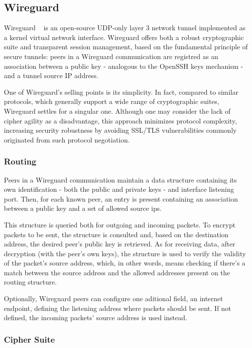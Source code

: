 \documentclass[11pt,twoside,a4paper]{report}
\begin{document}
\subsection{Wireguard}

Wireguard ~\cite{donenfeld2017wireguard} is an open-source UDP-only layer 3 network tunnel implemented as a kernel virtual network interface. Wireguard offers both a robust cryptographic suite and transparent session management, based on the fundamental principle of secure tunnels: peers in a Wireguard communication are registred as an association between a public key - analogous to the OpenSSH keys mechanism - and a tunnel source IP address.

One of Wireguard's selling points is its simplicity. In fact, compared to similar protocols, which generally support a wide range of cryptographic suites, Wireguard settles for a singular one. Although one may consider the lack of cipher agility as a disadvantage, this approach minimizes protocol complexity, increasing security robustness by avoiding SSL/TLS vulnerabilities commonly originated from such protocol negotiation.

\subsubsection{Routing}

Peers in a Wireguard communication maintain a data structure containing its own identification - both the public and private keys - and interface listening port. Then, for each known peer, an entry is present containing an association between a public key and a set of allowed source ips.

This structure is queried both for outgoing and incoming packets. To encrypt packets to be sent, the structure is consulted and, based on the destination address, the desired peer's public key is retrieved. As for receiving data, after decryption (with the peer's own keys), the structure is used to verify the validity of the packet's source address, which, in other words, means checking if there's a match between the source address and the allowed addresses present on the routing structure.

Optionally, Wireguard peers can configure one aditional field, an internet endpoint, defining the listening address where packets should be sent. If not defined, the incoming packets' source address is used instead.

\subsubsection{Cipher Suite}
\end{document}
